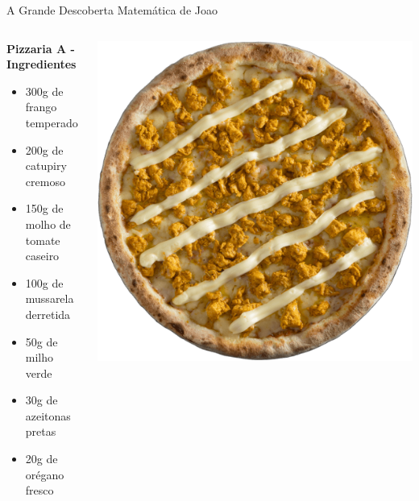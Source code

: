 \documentclass[12pt]{beamer}
\begin{document}
    \begin{frame}{A Grande Descoberta Matemática de Joao}
    
        \begin{columns}
        \begin{column}{0.6\textwidth}
       
            \textbf{Pizzaria A - Ingredientes}

            \begin{itemize}
                \item [1.] 300g de frango temperado
                \item [2.] 200g de catupiry cremoso
                \item [3.] 150g de molho de tomate caseiro
                \item [4.] 100g de mussarela derretida
                \item [5.] 50g de milho verde
                \item [6.] 30g de azeitonas pretas
                \item [7.] 20g de orégano fresco
            \end{itemize}
            
        \end{column}

        \begin{column}{0.4\textwidth}
            \centering
            \includegraphics[width=0.8\linewidth]{imagens/pizza_1.png}
        \end{column}
    \end{columns}
        
    \end{frame}
\end{document}
